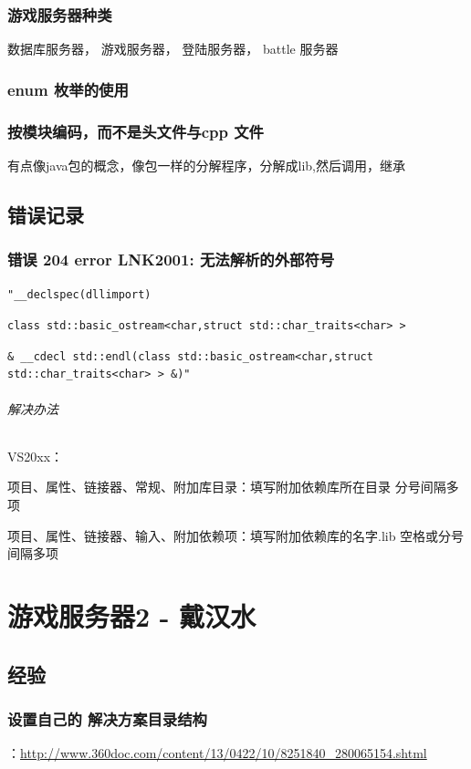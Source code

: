 \documentclass[UTF8,a4paper,8pt]{ctexbook}
\begin{document}
		 \subsection{游戏服务器种类}
		 数据库服务器， 游戏服务器， 登陆服务器， battle 服务器
		 
		 \subsection{enum 枚举的使用}
		 
		 \subsection{按模块编码，而不是头文件与cpp 文件}有点像java包的概念，像包一样的分解程序，分解成lib,然后调用，继承
		 
\newpage
	\section{错误记录}
		\subsection{错误	204	error LNK2001: 无法解析的外部符号} 
		\verb|"__declspec(dllimport)| 
		
		\verb|class std::basic_ostream<char,struct std::char_traits<char> >| 
		
		\verb|& __cdecl std::endl(class std::basic_ostream<char,struct std::char_traits<char> > &)"| 
		
		\subparagraph{解决办法}
		VS20xx：
		
		项目、属性、链接器、常规、附加库目录：填写附加依赖库所在目录 分号间隔多项
		
		项目、属性、链接器、输入、附加依赖项：填写附加依赖库的名字.lib 空格或分号间隔多项


\chapter{游戏服务器2 - 戴汉水}
	\section{经验}
	
		\subsection{设置自己的 解决方案目录结构}：\url{http://www.360doc.com/content/13/0422/10/8251840_280065154.shtml}
	
\end{document}
